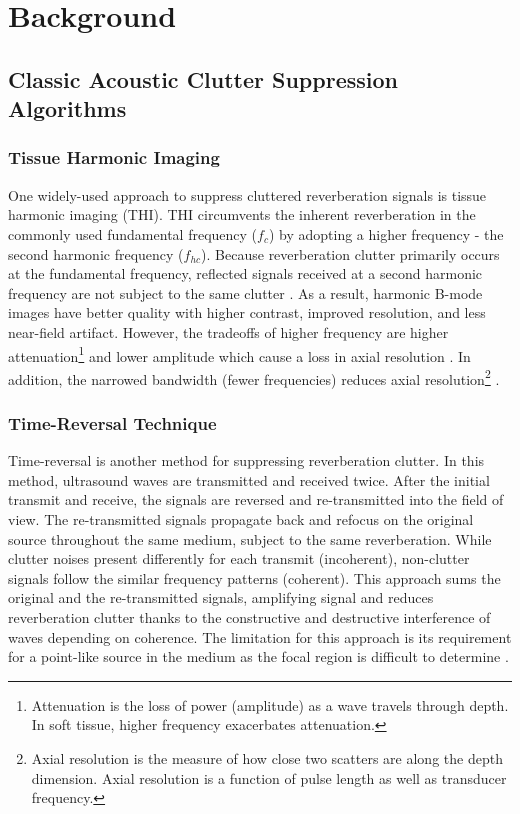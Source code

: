 \chapter{Background}
  \section{Classic Acoustic Clutter Suppression Algorithms} %
    \subsection{Tissue Harmonic Imaging}
      One widely-used approach to suppress cluttered reverberation signals is tissue harmonic imaging (THI). THI circumvents the inherent reverberation in the commonly used fundamental frequency ($f_{c}$) by adopting a higher frequency - the second harmonic frequency ($f_{hc}$). Because reverberation clutter primarily occurs at the fundamental frequency, reflected signals received at a second harmonic frequency are not subject to the same clutter \cite{christopher1997finite, ward1997nonlinear, averkiou1997nonlinear}. As a result, harmonic B-mode images have better quality with higher contrast, improved resolution, and less near-field artifact. However, the tradeoffs of higher frequency are higher attenuation\footnote{Attenuation is the loss of power (amplitude) as a wave travels through depth. In soft tissue, higher frequency exacerbates attenuation.} and lower amplitude which cause a loss in axial resolution \cite{muir1980prediction, starritt1986development, humphrey2000nonlinear, cobbold2006foundations, anvari2015primer}. In addition, the narrowed bandwidth (fewer frequencies) reduces axial resolution\footnote{Axial resolution is the measure of how close two scatters are along the depth dimension. Axial resolution is a function of pulse length as well as transducer frequency.} \cite{whittingham1999tissue}.

    \subsection{Time-Reversal Technique}
      Time-reversal is another method for suppressing reverberation clutter. In this method, ultrasound waves are transmitted and received twice. After the initial transmit and receive, the signals are reversed and re-transmitted into the field of view. The re-transmitted signals propagate back and refocus on the original source throughout the same medium, subject to the same reverberation. While clutter noises present differently for each transmit (incoherent), non-clutter signals follow the similar frequency patterns (coherent). This approach sums the original and the re-transmitted signals, amplifying signal and reduces reverberation clutter thanks to the constructive and destructive interference of waves depending on coherence. The limitation for this approach is its requirement for a point-like source in the medium as the focal region is difficult to determine \cite{dei_thesis, fink1992time}.

